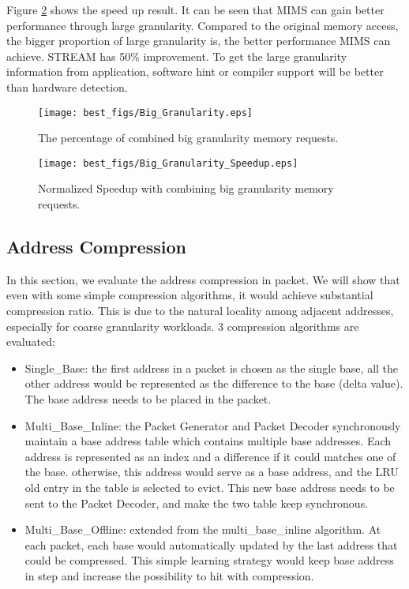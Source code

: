 \documentclass[pageno]{jpaper}
\begin{document}
 Figure \ref{Speedup_Big_Granularity} shows the speed up result. It can be seen that MIMS can gain better performance through large granularity. Compared to the original memory access, the bigger proportion of large granularity is, the better performance MIMS can achieve. STREAM has 50\% improvement. To get the large granularity information from application, software hint or compiler support will be better than hardware detection.

\begin{figure}
  \centering
  \texttt{[image: best\_figs/Big\_Granularity.eps]}
  \caption{The percentage of combined big granularity memory requests.}
  \label{Percentage_Big_Granularity}
\end{figure}

\begin{figure}
  \centering
  \texttt{[image: best\_figs/Big\_Granularity\_Speedup.eps]}
  \caption{Normalized Speedup with combining big granularity memory requests.}
  \label{Speedup_Big_Granularity}
\end{figure}



\subsection {Address Compression}

In this section, we evaluate the address compression in packet. We will show that even with some simple compression algorithms, it would achieve substantial compression ratio. This is due to the natural locality among adjacent addresses, especially for coarse granularity workloads. 3 compression algorithms are evaluated:
\begin{itemize}
\item Single\_Base: the first address in a packet is chosen as the single base, all the other address would be represented as the difference to the base (delta value). The base address needs to be placed in the packet.
\item Multi\_Base\_Inline: the Packet Generator and Packet Decoder synchronously maintain a base address table which contains multiple base addresses. Each address is represented as an index and a difference if it could matches one of the base. otherwise, this address would serve as a base address, and the LRU old entry in the table is selected to evict. This new base address needs to be sent to the Packet Decoder, and make the two table keep synchronous.
\item Multi\_Base\_Offline: extended from the multi\_base\_inline algorithm. At each packet, each base would automatically updated by the last address that could be compressed. This simple learning strategy would keep base address in step and increase the possibility to hit with compression.
\end{itemize}
\end{document}
